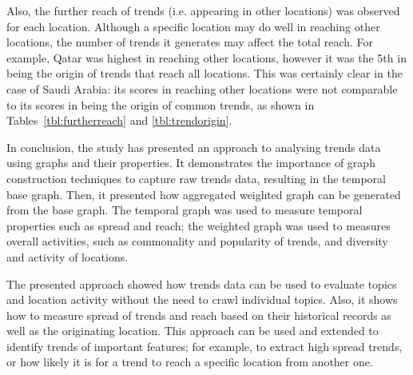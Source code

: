 \documentclass{llncs}
\begin{document}
Also, the further reach of trends (i.e. appearing in other locations)
was observed for each location. Although a specific location may do
well in reaching other locations, the number of trends it generates may
affect the total reach. For example, Qatar was highest in reaching
other locations, however it was the 5th in being the origin of trends
that reach all locations. This was certainly clear in the case of Saudi
Arabia: its scores in reaching other locations were not comparable to its
scores in being the origin of common trends, as shown in
Tables~\ref{tbl:furtherreach} and \ref{tbl:trendorigin}.

In conclusion, the study has presented an approach to analysing trends
data using graphs and their properties. It demonstrates the importance
of graph construction techniques to capture raw trends data, resulting
in the temporal base graph. Then, it presented how aggregated weighted
graph can be generated from the base graph. The temporal graph was
used to measure temporal properties such as spread and reach; the
weighted graph was used to measures overall activities, such as
commonality and popularity of trends, and diversity and activity of
locations.

The presented approach showed how trends data can be used to evaluate
topics and location activity without the need to crawl individual
topics. Also, it shows how to measure spread of trends and reach based
on their historical records as well as the originating location. This
approach can be used and extended to identify trends of important
features; for example, to extract high spread trends, or how likely it
is for a trend to reach a specific location from another one.






\end{document}
